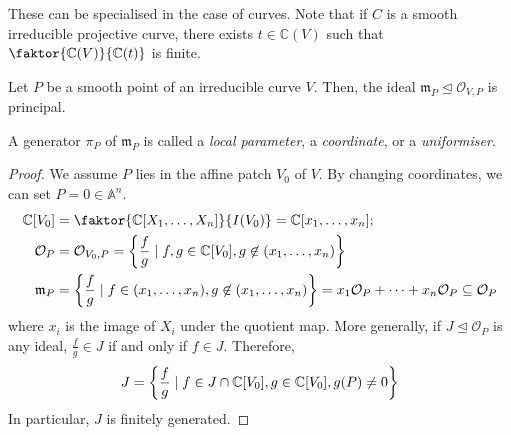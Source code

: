 These can be specialised in the case of curves.
Note that if \( C \) is a smooth irreducible projective curve, there exists \( t \in \mathbb C(V) \) such that \( \faktor{\mathbb C(V)}{\mathbb C(t)} \) is finite.
\begin{theorem}
    Let \( P \) be a smooth point of an irreducible curve \( V \).
    Then, the ideal \( \mathfrak m_P \trianglelefteq \mathcal O_{V,P} \) is principal.
\end{theorem}
A generator \( \pi_P \) of \( \mathfrak m_P \) is called a \emph{local parameter}, a \emph{coordinate}, or a \emph{uniformiser}.
\begin{proof}
    We assume \( P \) lies in the affine patch \( V_0 \) of \( V \).
    By changing coordinates, we can set \( P = 0 \in \mathbb A^n \).
    \begin{align*}
        \mathbb C[V_0] &= \faktor{\mathbb C[X_1, \dots, X_n]}{I(V_0)} = \mathbb C[x_1, \dots, x_n];\\
        \mathcal O_P &= \mathcal O_{V_0,P} = \qty{\frac{f}{g} \mid f, g \in \mathbb C[V_0], g \not\in (x_1, \dots, x_n)}\\
        \mathfrak m_P &= \qty{\frac{f}{g} \mid f \in (x_1, \dots, x_n), g \not\in (x_1, \dots, x_n)} = x_1 \mathcal O_P + \dots + x_n \mathcal O_P \subseteq \mathcal O_P
    \end{align*}
    where \( x_i \) is the image of \( X_i \) under the quotient map.
    More generally, if \( J \trianglelefteq \mathcal O_P \) is any ideal, \( \frac{f}{g} \in J \) if and only if \( f \in J \).
    Therefore,
    \[ J = \qty{\frac{f}{g} \mid f \in J \cap \mathbb C[V_0], g \in \mathbb C[V_0], g(P) \neq 0} \]
    In particular, \( J \) is finitely generated.


\end{proof}
